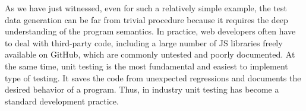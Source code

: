As we have just witnessed, even for such a relatively simple example, the test data generation can be far from trivial procedure because it requires the deep understanding of the program semantics. In practice, web developers often have to deal with third-party code, including a large number of JS libraries freely available on GitHub, which are commonly untested and poorly documented. At the same time, unit testing is the most fundamental and easiest to implement type of testing. It saves the code from unexpected regressions and documents the desired behavior of a program. Thus, in industry unit testing has become a standard development practice.
